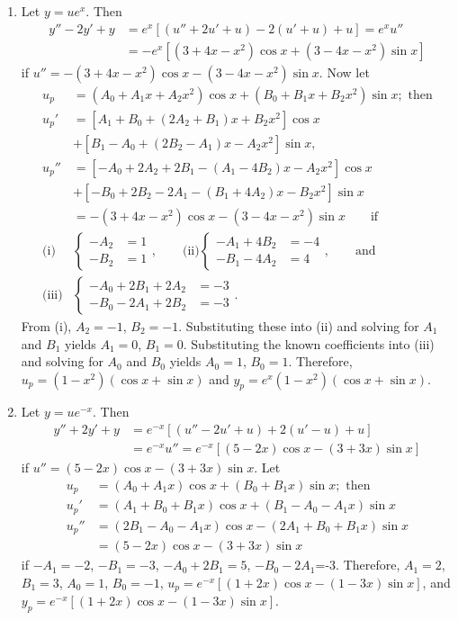 \documentclass[openany]{book}
\newenvironment{sectionSolutions}{
 \begin{enumerate}[item-label={\thesection.\arabic{enumi}.}]
}{
 \end{enumerate}
}
\begin{document}
\begin{sectionSolutions}
\item
Let $y=ue^x$. Then
\begin{align*}
y''-2y'+y&=e^x\left[(u''+2u'+u)-2(u'+u)+u\right]=e^xu''\\
&=-e^x\left[(3+4x-x^2)\cos x+(3-4x-x^2)\sin x\right]
\end{align*}
 if $u''=-(3+4x-x^2)\cos x-(3-4x-x^2)\sin x$.
Now let
\begin{align*}
u_p&=(A_0+A_1x+A_2x^2)\cos x +(B_0+B_1x+B_2x^2)\sin x;\text{ then}\\
u_p'&=\left[A_1+B_0+(2A_2+B_1)x+B_2x^2\right]\cos x\\
&+\left[B_1-A_0+(2B_2-A_1)x-A_2x^2\right]\sin x, \\
u_p ''&=\left[-A_0+2A_2+2B_1-(A_1-4B_2)x-A_2x^2\right]\cos x\\
&+\left[-B_0+2B_2-2A_1-(B_1+4A_2)x-B_2x^2\right]\sin x\\
&=-(3+4x-x^2)\cos x-(3-4x-x^2)\sin x\qquad\text{if}\\
\text{(i)}& \begin{cases}-A_2&=1\\ -B_2&=1 \end{cases},\qquad
\text{(ii)} \begin{cases} -A_1+4B_2&=-4
\\ -B_1-4A_2&=4\end{cases},\qquad\text{and}
\\
\text{(iii)}&
\begin{cases}-A_0+2B_1+2A_2&=-3
\\ -B_0-2A_1+2B_2&=-3\end{cases}.
\end{align*}
From (i), $A_2=-1$, $B_2=-1$. Substituting these into (ii) and solving
for $A_1$ and $B_1$ yields $A_1=0$, $B_1=0$. Substituting the known
coefficients into (iii) and solving for $A_0$ and $B_0$ yields
$A_0=1$, $B_0=1$. Therefore,$u_p=(1-x^2)(\cos x+\sin x)$ and
$y_p=e^x(1-x^2)(\cos x+\sin x)$.


\item
Let $y=ue^{-x}$. Then
\begin{align*}
y''+2y'+y&=e^{-x}\left[(u''-2u'+u)+2(u'-u)+u\right]\\
&=e^{-x}u''=e^{-x}\left[(5-2x)\cos x-(3+3x)\sin x\right]
\end{align*}
 if $u''=(5-2x)\cos x-(3+3x)\sin x$. Let
\begin{align*}
u_p&=(A_0+A_1x)\cos x+(B_0+B_1x)\sin x; \text{ then}\\
u_p'&=(A_1+B_0+B_1x)\cos x+(B_1-A_0-A_1x)\sin x\\
u_p''&=(2B_1-A_0-A_1x)\cos x-(2A_1+B_0+B_1x)\sin x\\
&=(5-2x)\cos x-(3+3x)\sin x
\end{align*}
if $-A_1=-2$, $-B_1=-3$, $-A_0+2B_1=5$, $-B_0-2A_1$=-3. Therefore,
$A_1=2$, $B_1=3$, $A_0=1$, $B_0=-1$, $u_p=e^{-x}\left[(1+2x)\cos
x-(1-3x)\sin x\right]$, and $y_p=e^{-x}\left[(1+2x)\cos x-(1-3x)\sin
x\right]$.



\end{sectionSolutions}
\end{document}
